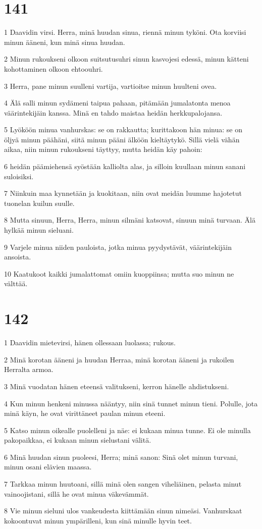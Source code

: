 \chapter{141}

\par 1 Daavidin virsi. Herra, minä huudan sinua, riennä minun tyköni. Ota korviisi minun ääneni, kun minä sinua huudan.
\par 2 Minun rukoukseni olkoon suitsutusuhri sinun kasvojesi edessä, minun kätteni kohottaminen olkoon ehtoouhri.
\par 3 Herra, pane minun suulleni vartija, vartioitse minun huulteni ovea.
\par 4 Älä salli minun sydämeni taipua pahaan, pitämään jumalatonta menoa väärintekijäin kanssa. Minä en tahdo maistaa heidän herkkupalojansa.
\par 5 Lyököön minua vanhurskas: se on rakkautta; kurittakoon hän minua: se on öljyä minun päähäni, siitä minun pääni älköön kieltäytykö. Sillä vielä vähän aikaa, niin minun rukoukseni täyttyy, mutta heidän käy pahoin:
\par 6 heidän päämiehensä syöstään kalliolta alas, ja silloin kuullaan minun sanani suloisiksi.
\par 7 Niinkuin maa kynnetään ja kuokitaan, niin ovat meidän luumme hajotetut tuonelan kuilun suulle.
\par 8 Mutta sinuun, Herra, Herra, minun silmäni katsovat, sinuun minä turvaan. Älä hylkää minun sieluani.
\par 9 Varjele minua niiden pauloista, jotka minua pyydystävät, väärintekijäin ansoista.
\par 10 Kaatukoot kaikki jumalattomat omiin kuoppiinsa; mutta suo minun ne välttää.

\chapter{142}

\par 1 Daavidin mietevirsi, hänen ollessaan luolassa; rukous.
\par 2 Minä korotan ääneni ja huudan Herraa, minä korotan ääneni ja rukoilen Herralta armoa.
\par 3 Minä vuodatan hänen eteensä valitukseni, kerron hänelle ahdistukseni.
\par 4 Kun minun henkeni minussa nääntyy, niin sinä tunnet minun tieni. Polulle, jota minä käyn, he ovat virittäneet paulan minun eteeni.
\par 5 Katso minun oikealle puolelleni ja näe: ei kukaan minua tunne. Ei ole minulla pakopaikkaa, ei kukaan minun sielustani välitä.
\par 6 Minä huudan sinun puoleesi, Herra; minä sanon: Sinä olet minun turvani, minun osani elävien maassa.
\par 7 Tarkkaa minun huutoani, sillä minä olen sangen viheliäinen, pelasta minut vainoojistani, sillä he ovat minua väkevämmät.
\par 8 Vie minun sieluni ulos vankeudesta kiittämään sinun nimeäsi. Vanhurskaat kokoontuvat minun ympärilleni, kun sinä minulle hyvin teet.

